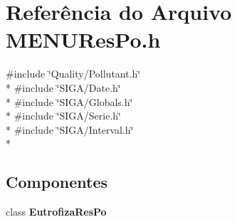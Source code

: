 \section{Referência do Arquivo M\+E\+N\+U\+Res\+Po.\+h}
\label{_m_e_n_u_res_po_8h}
{\ttfamily \#include \char`\"{}Quality/\+Pollutant.\+h\char`\"{}}\\*
{\ttfamily \#include \char`\"{}S\+I\+G\+A/\+Date.\+h\char`\"{}}\\*
{\ttfamily \#include \char`\"{}S\+I\+G\+A/\+Globals.\+h\char`\"{}}\\*
{\ttfamily \#include \char`\"{}S\+I\+G\+A/\+Serie.\+h\char`\"{}}\\*
{\ttfamily \#include \char`\"{}S\+I\+G\+A/\+Interval.\+h\char`\"{}}\\*
\subsection*{Componentes}
\begin{DoxyCompactItemize}
\item 
class {\bf Eutrofiza\+Res\+Po}
\end{DoxyCompactItemize}
